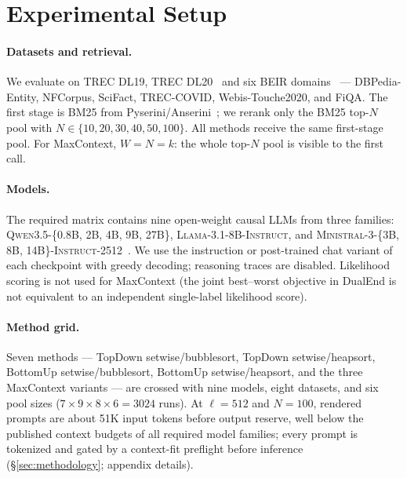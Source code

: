 \section{Experimental Setup}
\label{sec:experimental-setup}


\paragraph{Datasets and retrieval.}
We evaluate on TREC DL19, TREC DL20~\citep{bajaj2016msmarco, craswell2020dl19,craswell2021dl20} and six BEIR domains~\citep{thakur2021beir} --- DBPedia-Entity, NFCorpus, SciFact, TREC-COVID, Webis-Touche2020, and FiQA. The first stage is BM25 from Pyserini/Anserini~\citep{robertson2009probabilistic,lin2021pyserini,yang2017anserini}; we rerank only the BM25 top-$N$ pool with $N \in \{10,20,30,40,50,100\}$. All methods receive the same first-stage pool. For MaxContext, $W{=}N{=}k$: the whole top-$N$ pool is visible to the first call.

\paragraph{Models.}
The required matrix contains nine open-weight causal LLMs from three families: \textsc{Qwen3.5-\{0.8B, 2B, 4B, 9B, 27B\}}, \textsc{Llama-3.1-8B-Instruct}, and \textsc{Ministral-3-\{3B, 8B, 14B\}-Instruct-2512}~\citep{qwen35modelcard,dubey2024llama3,ministral3modelcard}. We use the instruction or post-trained chat variant of each checkpoint with greedy decoding; reasoning traces are disabled. Likelihood scoring is not used for MaxContext (the joint best--worst objective in DualEnd is not equivalent to an independent single-label likelihood score).

\paragraph{Method grid.}
Seven methods --- TopDown setwise/bubblesort, TopDown setwise/heapsort, BottomUp setwise/bubblesort, BottomUp setwise/heapsort, and the three MaxContext variants --- are crossed with nine models, eight datasets, and six pool sizes ($7 \times 9 \times 8 \times 6 = 3024$ runs). At $\ell{=}512$ and $N{=}100$, rendered prompts are about 51K input tokens before output reserve, well below the published context budgets of all required model families; every prompt is tokenized and gated by a context-fit preflight before inference (\S\ref{sec:methodology}; appendix details).

